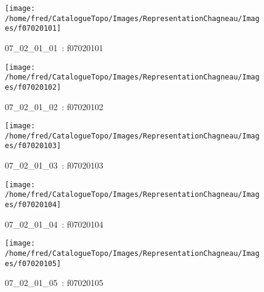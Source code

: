 \documentclass[12pt,titlepage]{book}
\begin{document}
\begin{figure}[h!]
  \hfill         %
  \begin{minipage}[t]{3cm}
    \begin{center}
      \texttt{[image: /home/fred/CatalogueTopo/Images/RepresentationChagneau/Images/f07020101]}
      \caption[~07\_02\_01\_01]{\small{07\_02\_01\_01~:} \tiny{f07020101}}\label{f07020101}
    \end{center}
  \end{minipage}
  \begin{minipage}[t]{3cm}
    \begin{center}
      \texttt{[image: /home/fred/CatalogueTopo/Images/RepresentationChagneau/Images/f07020102]}
      \caption[~07\_02\_01\_02]{\small{07\_02\_01\_02~:} \tiny{f07020102}}\label{f07020102}
    \end{center}
  \end{minipage}
  \begin{minipage}[t]{3cm}
    \begin{center}
      \texttt{[image: /home/fred/CatalogueTopo/Images/RepresentationChagneau/Images/f07020103]}
      \caption[~07\_02\_01\_03]{\small{07\_02\_01\_03~:} \tiny{f07020103}}\label{f07020103}
    \end{center}
  \end{minipage}
  \begin{minipage}[t]{3cm}
    \begin{center}
      \texttt{[image: /home/fred/CatalogueTopo/Images/RepresentationChagneau/Images/f07020104]}
      \caption[~07\_02\_01\_04]{\small{07\_02\_01\_04~:} \tiny{f07020104}}\label{f07020104}
    \end{center}
  \end{minipage}
  \begin{minipage}[t]{3cm}
    \begin{center}
      \texttt{[image: /home/fred/CatalogueTopo/Images/RepresentationChagneau/Images/f07020105]}
      \caption[~07\_02\_01\_05]{\small{07\_02\_01\_05~:} \tiny{f07020105}}\label{f07020105}
    \end{center}
  \end{minipage}
\end{figure}
\end{document}

